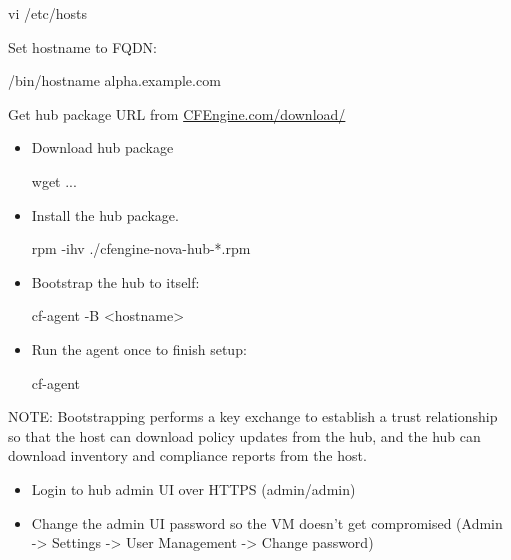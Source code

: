 \begin{code}
vi /etc/hosts
\end{code}
Set hostname to FQDN:

\begin{code}
/bin/hostname alpha.example.com
\end{code}





Get hub package URL from \href{http://cfengine.com/download/}{CFEngine.com/download/}

\begin{itemize}
\item{} Download hub package
\begin{code}
wget ...
\end{code}
\item{} Install the hub package.
\begin{code}
rpm -ihv ./cfengine-nova-hub-*.rpm
\end{code}
\end{itemize}





\begin{itemize}
\item{} Bootstrap the hub to itself:
\begin{code}
cf-agent -B <hostname>
\end{code}
\item{} Run the agent once to finish setup:
\begin{code}
cf-agent
\end{code}
\end{itemize}

NOTE: Bootstrapping performs a key exchange to establish a trust
relationship so that the host can download policy updates from
the hub, and the hub can download inventory and compliance reports
from the host.

\begin{itemize}
\item{} Login to hub admin UI over HTTPS (admin/admin)
\item{} Change the admin UI password so the VM doesn't get compromised
(Admin -\textgreater{} Settings -\textgreater{} User Management -\textgreater{} Change password)
\end{itemize}





